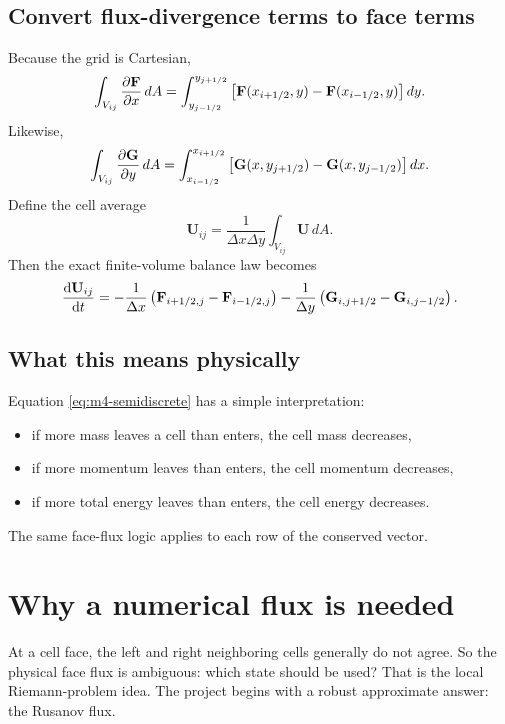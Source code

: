 \documentclass[11pt]{article}
\newcommand{\Uvec}{\mathbf{U}}
\newcommand{\Fvec}{\mathbf{F}}
\newcommand{\Gvec}{\mathbf{G}}
\begin{document}
\subsection{Convert flux-divergence terms to face terms}
Because the grid is Cartesian,
\begin{equation}
\int_{V_{ij}}\pdv{\Fvec}{x}\,dA
=
\int_{y_{j-1/2}}^{y_{j+1/2}}
\left[
\Fvec(x_{i+1/2},y)-\Fvec(x_{i-1/2},y)
\right]dy.
\end{equation}
Likewise,
\begin{equation}
\int_{V_{ij}}\pdv{\Gvec}{y}\,dA
=
\int_{x_{i-1/2}}^{x_{i+1/2}}
\left[
\Gvec(x,y_{j+1/2})-\Gvec(x,y_{j-1/2})
\right]dx.
\end{equation}
Define the cell average
\begin{equation}
\Uvec_{ij}
=
\frac{1}{\Delta x \Delta y}
\int_{V_{ij}} \Uvec\,dA.
\label{eq:m4-cellavg}
\end{equation}
Then the exact finite-volume balance law becomes
\begin{equation}
\dv{\Uvec_{ij}}{t}
=
-\frac{1}{\Delta x}
\left(
\Fvec_{i+1/2,j}-\Fvec_{i-1/2,j}
\right)
-\frac{1}{\Delta y}
\left(
\Gvec_{i,j+1/2}-\Gvec_{i,j-1/2}
\right).
\label{eq:m4-semidiscrete}
\end{equation}

\subsection{What this means physically}
Equation \eqref{eq:m4-semidiscrete} has a simple interpretation:
\begin{itemize}[leftmargin=1.8em]
    \item if more mass leaves a cell than enters, the cell mass decreases,
    \item if more momentum leaves than enters, the cell momentum decreases,
    \item if more total energy leaves than enters, the cell energy decreases.
\end{itemize}
The same face-flux logic applies to each row of the conserved vector.

\section{Why a numerical flux is needed}
At a cell face, the left and right neighboring cells generally do not agree. So the physical face flux is ambiguous: which state should be used? That is the local Riemann-problem idea. The project begins with a robust approximate answer: the Rusanov flux.
\end{document}
